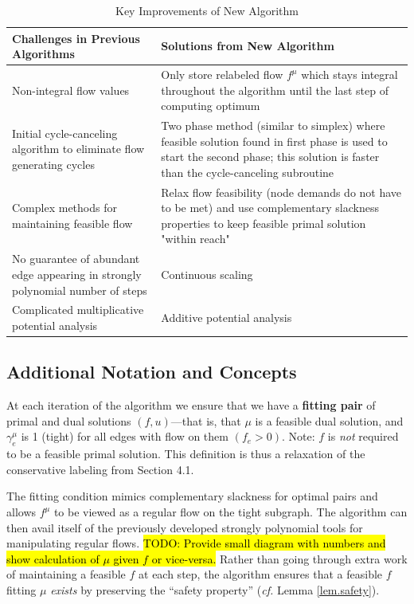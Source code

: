 \documentclass[11pt]{article}
\theoremstyle{definition}
\theoremstyle{definition}
\newcommand{\todo}[1]{\hl{TODO: #1}}
\begin{document}
\begin{table}[H]
\begin{center}
    \begin{tabular}{ | p{7cm} | p{7cm} |}
    \hline
    Challenges in Previous Algorithms  & Solutions from New Algorithm \\ \hline
    Non-integral flow values & Only store relabeled flow $f^{\mu}$ which stays integral throughout the algorithm until the last step of computing optimum \\ \hline
    Initial cycle-canceling algorithm to eliminate flow generating cycles & Two phase method (similar to simplex) where feasible solution found in first phase is used to start the second phase; this solution is faster than the cycle-canceling subroutine \\ \hline
    Complex methods for maintaining feasible flow & Relax flow feasibility (node demands do not have to be met) and use complementary slackness properties to keep feasible primal solution "within reach" \\ \hline
    No guarantee of abundant edge appearing in strongly polynomial number of steps \cite{Radzik2004} &  Continuous scaling\\ \hline
    Complicated multiplicative potential analysis \cite{Vegh2013} & Additive potential analysis \\
    \hline
    \end{tabular}
\end{center}
\caption{Key Improvements of New Algorithm}
\label{tab:improvements}
\end{table}

    \subsection{Additional Notation and Concepts}
	At each iteration of the algorithm we ensure that we have a \textbf{fitting pair}
	of primal and dual solutions $(f,u)$---that is, that $\mu$ is a feasible dual solution,
	and $\gamma_e^{\mu}$ is 1 (tight) for all edges with flow on them $(f_e > 0)$. Note: $f$ is
	\emph{not} required to be a feasible primal solution. This definition is thus a relaxation of the
	conservative labeling from Section 4.1.
	
	The fitting condition mimics complementary
	slackness for optimal pairs and allows $f^\mu$ to be viewed as a regular flow
	on the tight subgraph. The algorithm can then avail itself of the previously developed
	strongly polynomial tools for manipulating regular flows.
	\todo{Provide small diagram with numbers and show calculation of $\mu$ given $f$ or vice-versa.}
	Rather than going through extra work of maintaining a feasible $f$ at each step,
	the algorithm ensures that a feasible $f$ fitting $\mu$ \textit{exists} by preserving the
	``safety property'' (\emph{cf.} Lemma \ref{lem.safety}). 
	
\end{document}

